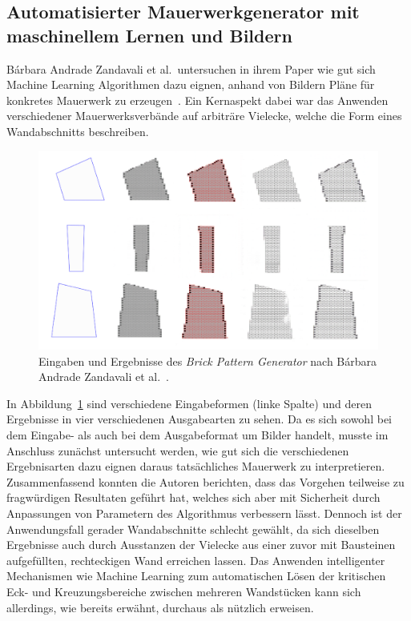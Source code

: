 \subsection{Automatisierter Mauerwerkgenerator mit maschinellem Lernen und Bildern}
Bárbara Andrade Zandavali et al.\ untersuchen in ihrem Paper wie gut sich Machine Learning Algorithmen dazu eignen, anhand von Bildern Pläne für konkretes Mauerwerk zu erzeugen~\cite{Zandavali2019}.
Ein Kernaspekt dabei war das Anwenden verschiedener Mauerwerksverbände auf arbiträre Vielecke, welche die Form eines Wandabschnitts beschreiben.
\begin{figure}[t!]
    \centering
    \includegraphics[width=0.8\columnwidth]{fig/ecaadesigradi2019_605.png}
    \caption{Eingaben und Ergebnisse des \textit{Brick Pattern Generator} nach Bárbara Andrade Zandavali et al.~\cite{Zandavali2019}.}\label{fig:related:Zandavali2019}
\end{figure}
In Abbildung~\ref{fig:related:Zandavali2019} sind verschiedene Eingabeformen (linke Spalte) und deren Ergebnisse in vier verschiedenen Ausgabearten zu sehen.
Da es sich sowohl bei dem Eingabe- als auch bei dem Ausgabeformat um Bilder handelt, musste im Anschluss zunächst untersucht werden, wie gut sich die verschiedenen Ergebnisarten dazu eignen daraus tatsächliches Mauerwerk zu interpretieren.
Zusammenfassend konnten die Autoren berichten, dass das Vorgehen teilweise zu fragwürdigen Resultaten geführt hat, welches sich aber mit Sicherheit durch Anpassungen von Parametern des Algorithmus verbessern lässt.
Dennoch ist der Anwendungsfall gerader Wandabschnitte schlecht gewählt, da sich dieselben Ergebnisse auch durch \glqq{}Ausstanzen\grqq{} der Vielecke aus einer zuvor mit Bausteinen aufgefüllten, rechteckigen Wand erreichen lassen.
Das Anwenden intelligenter Mechanismen wie Machine Learning zum automatischen Lösen der kritischen Eck- und Kreuzungsbereiche zwischen mehreren Wandstücken kann sich allerdings, wie bereits erwähnt, durchaus als nützlich erweisen.

